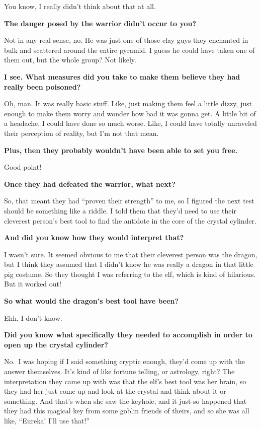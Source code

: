 \documentclass[smalldemyvopaper,11pt,twoside,onecolumn,openright,extrafontsizes]{memoir}
\begin{document}
You know, I really didn't think about that at all.

\textbf{The danger posed by the warrior didn't occur to you?}

Not in any real sense, no. He was just one of those clay guys they
enchanted in bulk and scattered around the entire pyramid. I guess he
could have taken one of them out, but the whole group? Not likely.

\textbf{I see. What measures did you take to make them believe they had
really been poisoned?}

Oh, man. It was really basic stuff. Like, just making them feel a little
dizzy, just enough to make them worry and wonder how bad it was gonna
get. A little bit of a headache. I could have done so much worse. Like,
I could have totally unraveled their perception of reality, but I'm not
that mean.

\textbf{Plus, then they probably wouldn't have been able to set you
free.}

Good point!

\textbf{Once they had defeated the warrior, what next?}

So, that meant they had ``proven their strength'' to me, so I figured
the next test should be something like a riddle. I told them that they'd
need to use their cleverest person's best tool to find the antidote in
the core of the crystal cylinder.

\textbf{And did you know how they would interpret that?}

I wasn't sure. It seemed obvious to me that their cleverest person was
the dragon, but I think they assumed that I didn't know he was really a
dragon in that little pig costume. So they thought I was referring to
the elf, which is kind of hilarious. But it worked out!

\textbf{So what would the dragon's best tool have been?}

Ehh, I don't know.

\textbf{Did you know what specifically they needed to accomplish in
order to open up the crystal cylinder?}

No.~I was hoping if I said something cryptic enough, they'd come up with
the answer themselves. It's kind of like fortune telling, or astrology,
right? The interpretation they came up with was that the elf's best tool
was her brain, so they had her just come up and look at the crystal and
think about it or something. And that's when she saw the keyhole, and it
just so happened that they had this magical key from some goblin friends
of theirs, and so she was all like, ``Eureka! I'll use that!''
\end{document}

